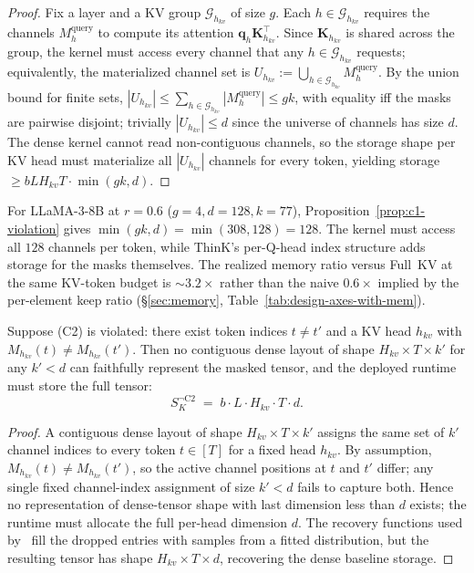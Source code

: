 \documentclass{article}
\begin{document}
\begin{proof}
Fix a layer and a KV group $\mathcal{G}_{h_{kv}}$ of size $g$. Each $h \in \mathcal{G}_{h_{kv}}$ requires the channels $M_h^{\mathrm{query}}$ to compute its attention $\mathbf{q}_h \mathbf{K}_{h_{kv}}^\top$. Since $\mathbf{K}_{h_{kv}}$ is shared across the group, the kernel must access every channel that any $h \in \mathcal{G}_{h_{kv}}$ requests; equivalently, the materialized channel set is $U_{h_{kv}} := \bigcup_{h \in \mathcal{G}_{h_{kv}}} M_h^{\mathrm{query}}$. By the union bound for finite sets, $|U_{h_{kv}}| \leq \sum_{h \in \mathcal{G}_{h_{kv}}} |M_h^{\mathrm{query}}| \leq g k$, with equality iff the masks are pairwise disjoint; trivially $|U_{h_{kv}}| \leq d$ since the universe of channels has size $d$. The dense kernel cannot read non-contiguous channels, so the storage shape per KV head must materialize all $|U_{h_{kv}}|$ channels for every token, yielding storage $\geq b L H_{kv} T \cdot \min(gk, d)$.
\end{proof}
 
\begin{remark}
For LLaMA-3-8B at $r = 0.6$ ($g = 4, d = 128, k = 77$), Proposition~\ref{prop:c1-violation} gives $\min(gk, d) = \min(308, 128) = 128$. The kernel must access all $128$ channels per token, while ThinK's per-Q-head index structure adds storage for the masks themselves. The realized memory ratio versus Full~KV at the same KV-token budget is $\sim 3.2\times$ rather than the naive $0.6\times$ implied by the per-element keep ratio (\S\ref{sec:memory}, Table~\ref{tab:design-axes-with-mem}).
\end{remark}
 
\begin{proposition}[C2 Violation]
\label{prop:c2-violation}
Suppose (C2) is violated: there exist token indices $t \neq t'$ and a KV head $h_{kv}$ with $M_{h_{kv}}(t) \neq M_{h_{kv}}(t')$. Then no contiguous dense layout of shape $H_{kv} \times T \times k'$ for any $k' < d$ can faithfully represent the masked tensor, and the deployed runtime must store the full tensor:
\begin{equation}
S_K^{\neg \mathrm{C2}} \;=\; b \cdot L \cdot H_{kv} \cdot T \cdot d.
\end{equation}
\end{proposition}
 
\begin{proof}
A contiguous dense layout of shape $H_{kv} \times T \times k'$ assigns the same set of $k'$ channel indices to every token $t \in [T]$ for a fixed head $h_{kv}$. By assumption, $M_{h_{kv}}(t) \neq M_{h_{kv}}(t')$, so the active channel positions at $t$ and $t'$ differ; any single fixed channel-index assignment of size $k' < d$ fails to capture both. Hence no representation of dense-tensor shape with last dimension less than $d$ exists; the runtime must allocate the full per-head dimension $d$. The recovery functions used by~\citet{spark} fill the dropped entries with samples from a fitted distribution, but the resulting tensor has shape $H_{kv} \times T \times d$, recovering the dense baseline storage.
\end{proof}
 
\end{document}
